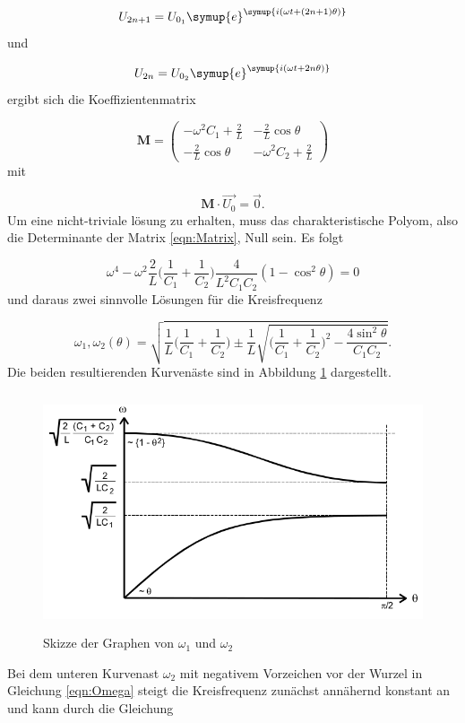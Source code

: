 \begin{equation}
  U_{2n+1} = U_{0_1} \symup{e}^{\symup{i(\omega t + (2n+1)\theta)}}
\end{equation}
und

\begin{equation}
  U_{2n} = U_{0_2} \symup{e}^{\symup{i(\omega t + 2n\theta)}}
\end{equation}
ergibt sich die Koeffizientenmatrix

\begin{equation}
  \symbf{M} =
  \begin{pmatrix}
    -\omega^2 C_1 + \frac{2}{L} & -\frac{2}{L} \cos \theta \\
    -\frac{2}{L} \cos \theta & -\omega^2 C_2 + \frac{2}{L}
  \end{pmatrix}
  \label{eqn:Matrix}
\end{equation}
mit

\begin{equation}
  \symbf{M} \cdot \vec{U_0} = \vec{0}.
\end{equation}
Um eine nicht-triviale lösung zu erhalten, muss das charakteristische Polyom,
also die Determinante der Matrix \eqref{eqn:Matrix}, Null sein.
Es folgt

\begin{equation}
  \omega^4 - \omega^2 \frac{2}{L} \biggl(\frac{1}{C_1} + \frac{1}{C_2}\biggr)
  \frac{4}{L^2 C_1 C_2} (1 - \cos^2 \theta) = 0
\end{equation}
und daraus zwei sinnvolle Lösungen für die Kreisfrequenz \omega

\begin{equation}
  \omega_1, \omega_2 (\theta) = \sqrt{\frac{1}{L} \biggl(\frac{1}{C_1} +
  \frac{1}{C_2}\biggr)
  \pm \frac{1}{L} \sqrt{\biggl(\frac{1}{C_1} + \frac{1}{C_2}\biggr)^2 -
  \frac{4 \sin^2 \theta}{C_1C_2}}}.
  \label{eqn:Omega}
\end{equation}
Die beiden resultierenden Kurvenäste sind in Abbildung \ref{fig:KurveLC1C2}
dargestellt.

\begin{figure}
  \centering
  \includegraphics[height=7cm]{KurveLC1C2.png}
  \caption{Skizze der Graphen von $\omega_1$ und $\omega_2$}
  \label{fig:KurveLC1C2}
\end{figure}
Bei dem unteren Kurvenast $\omega_2$ mit negativem Vorzeichen vor der Wurzel
in Gleichung \eqref{eqn:Omega}
steigt die Kreisfrequenz zunächst annähernd konstant an und kann durch die
Gleichung

